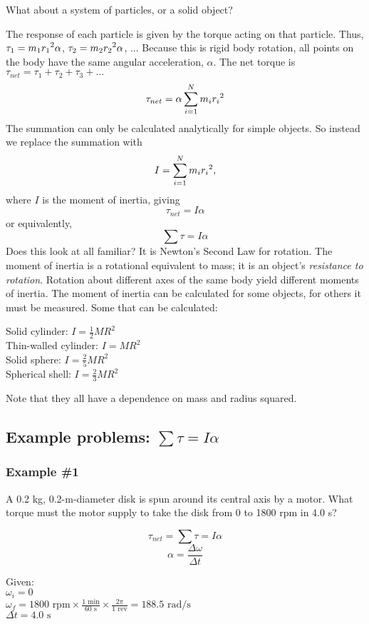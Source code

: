 What about a system of particles, or a solid object?

\vspace{5cm}

The response of each particle is given by the torque acting on that particle. Thus, $\tau_1=m_1r_1\displaystyle^2\alpha$, $\tau_2=m_2r_2\displaystyle^2\alpha$, $...$ Because this is rigid body rotation, all points on the body have the same angular acceleration, $\alpha$. The net torque is $\tau_{net}=\tau_1+\tau_2+\tau_3+...$
$$\tau_{net}=\alpha\sum_{i=1}^Nm_ir_i\displaystyle^2$$
The summation can only be calculated analytically for simple objects. So instead we replace the summation with
$$I=\sum_{i=1}^Nm_ir_i\displaystyle^2,$$
where $I$ is the moment of inertia, giving
$$\tau_{net}=I\alpha$$
or equivalently,
$$\boxed{\sum\tau=I\alpha}$$
Does this look at all familiar? It is Newton's Second Law for rotation. The moment of inertia is a rotational equivalent to mass; it is an object's \textit{resistance to rotation}. Rotation about different axes of the same body yield different moments of inertia. The moment of inertia can be calculated for some objects, for others it must be measured. Some that can be calculated:

Solid cylinder: $I=\frac{1}{2}MR^2$\\
Thin-walled cylinder: $I=MR^2$\\
Solid sphere: $I=\frac{2}{5}MR^2$\\
Spherical shell: $I=\frac{2}{3}MR^2$

Note that they all have a dependence on mass and radius squared.

\subsection{Example problems: $\sum\tau=I\alpha$}
\subsubsection{Example \#1}
A 0.2 kg, 0.2-m-diameter disk is spun around its central axis by a motor. What torque must the motor supply to take the disk from 0 to 1800 rpm in 4.0 s?

$$\tau_{net}=\sum\tau=I\alpha$$
$$\alpha=\frac{\Delta\omega}{\Delta t}$$

Given:\\
$\omega_i=0$\\
$\omega_f=1800\mbox{ rpm}\times\frac{1\mbox{ min}}{60\mbox{ s}}\times\frac{2\pi}{1\mbox{ rev}}=188.5\mbox{ rad/s}$\\
$\Delta t=4.0\mbox{ s}$


